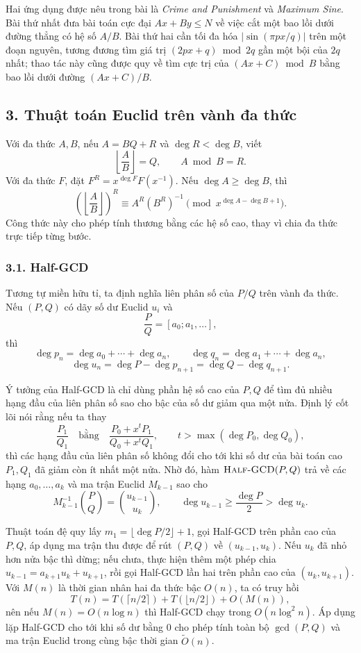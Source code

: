 \documentclass[11pt]{article}
\begin{document}
Hai ứng dụng được nêu trong bài là \emph{Crime and Punishment} và
\emph{Maximum Sine}. Bài thứ nhất đưa bài toán cực đại \(Ax+By\le N\) về việc
cắt một bao lồi dưới đường thẳng có hệ số \(A/B\). Bài thứ hai cần tối đa hóa
\(|\sin(\pi px/q)|\) trên một đoạn nguyên, tương đương tìm giá trị
\((2px+q)\bmod 2q\) gần một bội của \(2q\) nhất; thao tác này cũng được quy
về tìm cực trị của \((Ax+C)\bmod B\) bằng bao lồi dưới đường
\((Ax+C)/B\).

\subsection*{3. Thuật toán Euclid trên vành đa thức}

Với đa thức \(A,B\), nếu \(A=BQ+R\) và \(\deg R<\deg B\), viết
\[
  \left\lfloor \frac AB\right\rfloor=Q,\qquad A\bmod B=R.
\]
Với đa thức \(F\), đặt \(F^R=x^{\deg F}F(x^{-1})\). Nếu \(\deg A\ge\deg B\),
thì
\[
  \left(\left\lfloor\frac AB\right\rfloor\right)^R
  \equiv A^R(B^R)^{-1}\pmod {x^{\deg A-\deg B+1}}.
\]
Công thức này cho phép tính thương bằng các hệ số cao, thay vì chia đa thức
trực tiếp từng bước.

\subsubsection*{3.1. Half-GCD}

Tương tự miền hữu tỉ, ta định nghĩa liên phân số của \(P/Q\) trên vành đa
thức. Nếu \((P,Q)\) có dãy số dư Euclid \(u_i\) và
\[
  \frac PQ=[a_0;a_1,\ldots],
\]
thì
\[
  \deg p_n=\deg a_0+\cdots+\deg a_n,\qquad
  \deg q_n=\deg a_1+\cdots+\deg a_n,
\]
\[
  \deg u_n=\deg P-\deg p_{n+1}
           =\deg Q-\deg q_{n+1}.
\]

Ý tưởng của Half-GCD là chỉ dùng phần hệ số cao của \(P,Q\) để tìm đủ nhiều
hạng đầu của liên phân số sao cho bậc của số dư giảm qua một nửa. Định lý cốt
lõi nói rằng nếu ta thay
\[
  \frac{P_1}{Q_1}
  \quad\text{bằng}\quad
  \frac{P_0+x^tP_1}{Q_0+x^tQ_1},
  \qquad t>\max(\deg P_0,\deg Q_0),
\]
thì các hạng đầu của liên phân số không đổi cho tới khi số dư của bài toán
cao \(P_1,Q_1\) đã giảm còn ít nhất một nửa. Nhờ đó, hàm
\(\textsc{Half-GCD}(P,Q)\) trả về các hạng \(a_0,\ldots,a_k\) và ma trận
Euclid \(M_{k-1}\) sao cho
\[
  M_{k-1}^{-1}\binom{P}{Q}=\binom{u_{k-1}}{u_k},
  \qquad
  \deg u_{k-1}\ge \frac{\deg P}{2}>\deg u_k .
\]

Thuật toán đệ quy lấy \(m_1=\lfloor\deg P/2\rfloor+1\), gọi Half-GCD trên
phần cao của \(P,Q\), áp dụng ma trận thu được để rút \((P,Q)\) về
\((u_{k-1},u_k)\). Nếu \(u_k\) đã nhỏ hơn nửa bậc thì dừng; nếu chưa, thực
hiện thêm một phép chia \(u_{k-1}=a_{k+1}u_k+u_{k+1}\), rồi gọi Half-GCD lần
hai trên phần cao của \((u_k,u_{k+1})\). Với \(M(n)\) là thời gian nhân hai
đa thức bậc \(O(n)\), ta có truy hồi
\[
  T(n)=T(\lceil n/2\rceil)+T(\lfloor n/2\rfloor)+O(M(n)),
\]
nên nếu \(M(n)=O(n\log n)\) thì Half-GCD chạy trong \(O(n\log^2 n)\).
Áp dụng lặp Half-GCD cho tới khi số dư bằng \(0\) cho phép tính toàn bộ
\(\gcd(P,Q)\) và ma trận Euclid trong cùng bậc thời gian \(\widetilde O(n)\).
\end{document}
